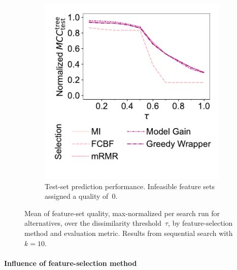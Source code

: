 \documentclass{article}
\theoremstyle{definition}
\begin{document}
\begin{figure}[p]
\begin{subfigure}[t]{0.48\textwidth}
		\includegraphics[width=\textwidth, trim=20 40 15 15, clip]{plots/afs-impact-tau-fs-method-decision-tree-test-mcc-max-fillna.pdf}
		\caption{
			Test-set prediction performance.
			Infeasible feature sets assigned a quality of~0.
		}
		\label{fig:afs:impact-tau-fs-method-decision-tree-test-mcc-max-fillna}
	\end{subfigure}
	\caption{
		Mean of feature-set quality, max-normalized per search run for alternatives, over the dissimilarity threshold~$\tau$, by feature-selection method and evaluation metric.
		Results from sequential search with $k=10$.
	}
	\label{fig:afs:impact-tau-fs-method-quality}
\end{figure}

\paragraph{Influence of feature-selection method}
\end{document}
